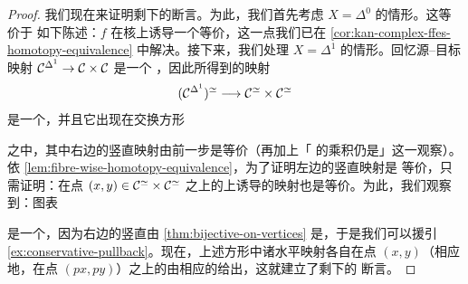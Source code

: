 \begin{proof}
我们现在来证明剩下的断言。为此，我们首先考虑 $X = \Delta^0$ 的情形。这等价于
如下陈述：$f$ 在\trGroupoid{}核上诱导一个\trHomotopy{}等价，这一点我们已在
\cref{cor:kan-complex-ffes-homotopy-equivalence} 中解决。接下来，我们处理
$X = \Delta^1$ 的情形。回忆源–目标映射 $\mathcal{C}^{\Delta^1} \to \mathcal{C} \times \mathcal{C}$ 是一个%
\trIsofibration{}，因此所得到的映射
\[
(\mathcal{C}^{\Delta^1})^{\simeq} \longrightarrow \mathcal{C}^{\simeq} \times \mathcal{C}^{\simeq}
\]
是一个\trKanFibration{}，并且它出现在交换方形
\begin{center}
\end{center}
之中，其中右边的竖直映射由前一步是\trHomotopy{}等价（再加上「%
\trJoyalEquivalence{}的乘积仍是\trJoyalEquivalence{}」这一观察）。依
\cref{lem:fibre-wise-homotopy-equivalence}，为了证明左边的竖直映射是%
\trHomotopy{}等价，只需证明：在点 $(x, y) \in \mathcal{C}^{\simeq} \times \mathcal{C}^{\simeq}$
之上的\trFibre{}上诱导的映射也是\trHomotopy{}等价。为此，我们观察到：图表
\begin{center}
\end{center}
是一个\trPullback{}，因为右边的竖直\trFunctor{}由
\cref{thm:bijective-on-vertices} 是\trConservative{}，于是我们可以援引
\cref{ex:conservative-pullback}。现在，上述方形中诸水平映射各自在点 $(x, y)$（相应地，在点
$(px, py)$）之上的\trFibre{}由相应的\trMappingSpace{}给出，这就建立了剩下的
断言。


\end{proof}
